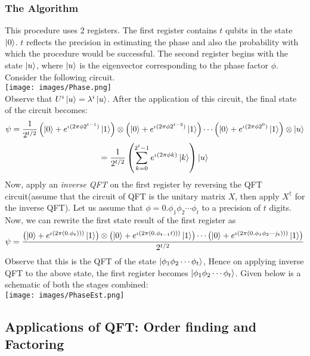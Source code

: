 \documentclass{article}
\begin{document}
\subsubsection{The Algorithm}
This procedure uses 2 registers. The first register contains $t$ qubits in the state $\ket{0}$. $t$ reflects the precision in estimating the phase and also the probability with which the procedure would be successful. The second register begins with the state $\ket{u}$, where $\ket{u}$ is the eigenvector corresponding to the phase factor $\phi$. Consider the following circuit. \\
\texttt{[image: images/Phase.png]}\\
Observe that $U^i\ket{u} = \lambda^i\ket{u}$. After the application of this circuit, the final state of the circuit becomes:
$$\psi = \frac{1}{2^{t/2}} \left(\ket{0}+e^{\iota(2\pi \phi 2^{t-1})}\ket{1} \right) \otimes \left(\ket{0}+e^{\iota(2\pi \phi 2^{t-2})}\ket{1} \right) \cdots \left(\ket{0}+e^{\iota(2\pi \phi 2^{0})}\ket{1} \right) \otimes \ket{u}$$
$$= \frac{1}{2^{t/2}} \left( \sum_{k=0}^{2^t-1} e^{\iota(2\pi \phi k)}\ket{k} \right) \ket{u}$$
Now, apply an \textit{inverse QFT} on the first register by reversing the QFT circuit(assume that the circuit of QFT is the unitary matrix $X$, then apply $X^{\dagger}$ for the inverse QFT). Let us assume that $\phi = 0.\phi_1\phi_2 \cdots \phi_t$ to a precision of $t$ digits. Now, we can rewrite the first state result of the first register as 
$$\psi = \frac{\left( \ket{0} + e^{\iota(2\pi (0.\phi_t)))}\ket{1}\right)\otimes  \left( \ket{0} + e^{\iota(2\pi (0.\phi_{t-1}{t})))}\ket{1}\right) \cdots \left( \ket{0} + e^{\iota(2\pi (0.\phi_1\phi_2 \cdots j_t)))}\ket{1}\right)}{2^{t/2}}$$
Observe that this is the QFT of the state $\ket{\phi_1\phi_2 \cdots \phi_t}$, Hence on applying inverse QFT to the above state, the first register becomes $\ket{\phi_1\phi_2 \cdots \phi_t}$. Given below is a schematic of both the stages combined:\\
\texttt{[image: images/PhaseEst.png]}
\cleardoublepage
\subsection{Applications of QFT: Order finding and Factoring}
\end{document}
